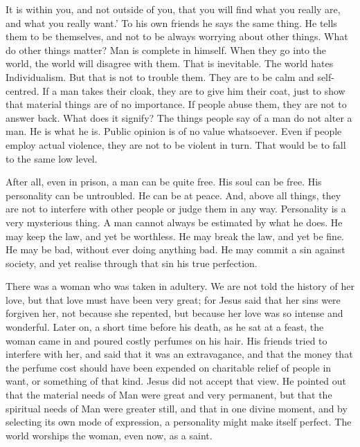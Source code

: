 It is within you, and not outside of you, that you will find what you really are, and what you really want.’ To his own friends he says the same thing. He tells them to be themselves, and not to be always worrying about other things. What do other things matter? Man is complete in himself. When they go into the world, the world will disagree with them. That is inevitable. The world hates Individualism. But that is not to trouble them. They are to be calm and self-centred. If a man takes their cloak, they are to give him their coat, just to show that material things are of no importance. If people abuse them, they are not to answer back. What does it signify? The things people say of a man do not alter a man. He is what he is. Public opinion is of no value whatsoever. Even if people employ actual violence, they are not to be violent in turn. That would be to fall to the same low level.\par

After all, even in prison, a man can be quite free. His soul can be free. His personality can be untroubled. He can be at peace. And, above all things, they are not to interfere with other people or judge them in any way. Personality is a very mysterious thing. A man cannot always be estimated by what he does. He may keep the law, and yet be worthless. He may break the law, and yet be fine. He may be bad, without ever doing anything bad. He may commit a sin against society, and yet realise through that sin his true perfection.\par

There was a woman who was taken in adultery. We are not told the history of her love, but that love must have been very great; for Jesus said that her sins were forgiven her, not because she repented, but because her love was so intense and wonderful. Later on, a short time before his death, as he sat at a feast, the woman came in and poured costly perfumes on his hair. His friends tried to interfere with her, and said that it was an extravagance, and that the money that the perfume cost should have been expended on charitable relief of people in want, or something of that kind. Jesus did not accept that view. He pointed out that the material needs of Man were great and very permanent, but that the spiritual needs of Man were greater still, and that in one divine moment, and by selecting its own mode of expression, a personality might make itself perfect. The world worships the woman, even now, as a saint.\par

